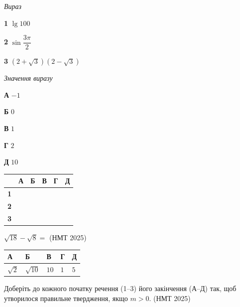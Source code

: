 \documentclass[14pt]{extarticle}
\newcommand{\answerTable}[5]{
\begin{center}
\begin{tabular}{|*{5}{>{\centering\arraybackslash}m{2.8cm}|}}
\hline
\rule[-0.3cm]{0pt}{0.8cm}\textbf{А} & \textbf{Б} & \textbf{В} & \textbf{Г} & \textbf{Д} \\
\hline
\rule[-0.4cm]{0pt}{1.0cm}#1 & \rule[-0.4cm]{0pt}{1.0cm}#2 & \rule[-0.4cm]{0pt}{1.0cm}#3 & \rule[-0.4cm]{0pt}{1.0cm}#4 & \rule[-0.4cm]{0pt}{1.0cm}#5 \\
\hline
\end{tabular}
\end{center}
}
\newcommand{\matchTable}{
\begin{tabular}{|>{\centering\arraybackslash}p{0.3cm}|*{5}{>{\centering\arraybackslash}p{0.3cm}|}}
\hline
& \textbf{А} & \textbf{Б} & \textbf{В} & \textbf{Г} & \textbf{Д} \\
\hline
\textbf{1} & \rule{0pt}{0.3cm} & & & & \\
\hline
\textbf{2} & \rule{0pt}{0.3cm} & & & & \\
\hline
\textbf{3} & \rule{0pt}{0.3cm} & & & & \\
\hline
\end{tabular}
}
\newcommand{\task}[2]{\noindent\makebox[1.5em][l]{\textbf{#1.}}\parbox[t]{\dimexpr\textwidth-1.5em}{#2}}
\newcommand{\nmtyear}[1]{\hfill{\small\color{yearcolor}(НМТ #1)}}
\begin{document}
\vspace{0.3cm}
\begin{minipage}{0.35\textwidth}
\textit{Вираз}

\vspace{0.2cm}
\textbf{1} \quad $\lg 100$

\vspace{0.3cm}
\textbf{2} \quad $\sin\dfrac{3\pi}{2}$

\vspace{0.2cm}
\textbf{3} \quad $(2 + \sqrt{3})(2 - \sqrt{3})$
\end{minipage}
\hfill
\begin{minipage}{0.3\textwidth}
\textit{Значення виразу}

\vspace{0.2cm}
\textbf{А} \quad $-1$

\vspace{0.2cm}
\textbf{Б} \quad $0$

\vspace{0.2cm}
\textbf{В} \quad $1$

\vspace{0.2cm}
\textbf{Г} \quad $2$

\vspace{0.2cm}
\textbf{Д} \quad $10$
\end{minipage}
\hfill
\begin{minipage}{0.2\textwidth}
\matchTable
\end{minipage}

\vspace{0.7cm}

\task{50}{$\sqrt{18} - \sqrt{8} =$ \nmtyear{2025}}
\answerTable{$\sqrt{2}$}{$\sqrt{10}$}{$10$}{$1$}{$5$}

\vspace{0.5cm}

\task{51}{Доберіть до кожного початку речення (1--3) його закінчення (А--Д) так, щоб утворилося правильне твердження, якщо $m > 0$. \nmtyear{2025}}
\end{document}
